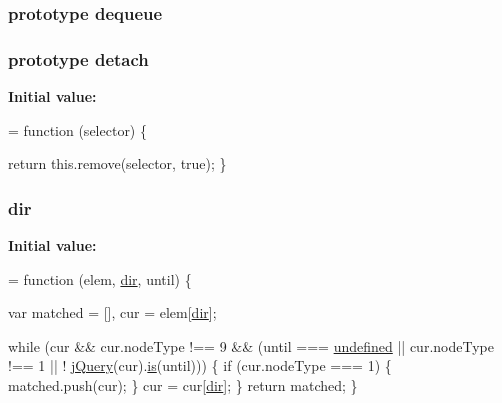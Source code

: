 \subsubsection[{\texorpdfstring{dequeue}{dequeue}}]{ {\bf prototype} dequeue}\hypertarget{jquery-2_82_81-vsdoc_8js_a721f718178dce35dc9a4bf9fe8b6de23}{}\label{jquery-2_82_81-vsdoc_8js_a721f718178dce35dc9a4bf9fe8b6de23}
\subsubsection[{\texorpdfstring{detach}{detach}}]{ {\bf prototype} detach}\hypertarget{jquery-2_82_81-vsdoc_8js_ad1e6b5c682e0bda12ba68acb35a39eeb}{}\label{jquery-2_82_81-vsdoc_8js_ad1e6b5c682e0bda12ba68acb35a39eeb}
{\bfseries Initial value\+:}
\begin{DoxyCode}
= \textcolor{keyword}{function} (selector) \{
        

        \textcolor{keywordflow}{return} this.\textcolor{keyword}{remove}(selector, \textcolor{keyword}{true});
    \}
\end{DoxyCode}
\subsubsection[{\texorpdfstring{dir}{dir}}]{ dir}\hypertarget{jquery-2_82_81-vsdoc_8js_a49baab980d9b27347df35195d88ef25f}{}\label{jquery-2_82_81-vsdoc_8js_a49baab980d9b27347df35195d88ef25f}
{\bfseries Initial value\+:}
\begin{DoxyCode}
= \textcolor{keyword}{function} (elem, \hyperlink{jquery-2_82_81-vsdoc_8js_a49baab980d9b27347df35195d88ef25f}{dir}, until) \{

        var matched = [],
            cur = elem[\hyperlink{jquery-2_82_81-vsdoc_8js_a49baab980d9b27347df35195d88ef25f}{dir}];

        \textcolor{keywordflow}{while} (cur && cur.nodeType !== 9 && (until === \hyperlink{jquery-2_82_81-vsdoc_8js_a08113a236cc18d2a9d5ce27e638012be}{undefined} || cur.nodeType !== 1 || !
      \hyperlink{jquery-2_82_81-vsdoc_8js_add5237586d970a38a81f990e8eb28c6c}{jQuery}(cur).\hyperlink{jquery-2_82_81-vsdoc_8js_ab09af0fb8923d70813f6d128591d1962}{is}(until))) \{
            \textcolor{keywordflow}{if} (cur.nodeType === 1) \{
                matched.push(cur);
            \}
            cur = cur[\hyperlink{jquery-2_82_81-vsdoc_8js_a49baab980d9b27347df35195d88ef25f}{dir}];
        \}
        \textcolor{keywordflow}{return} matched;
    \}
\end{DoxyCode}
